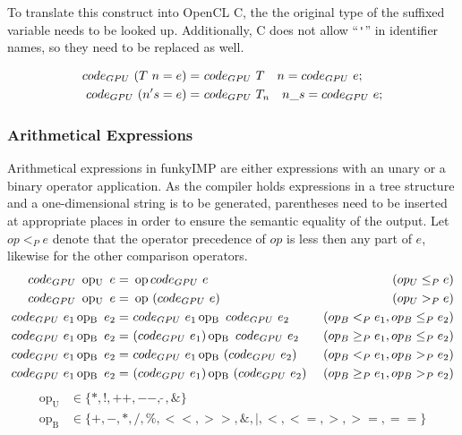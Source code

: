 

To translate this construct into OpenCL C, the the original type of the suffixed variable needs to be looked up. Additionally, C does not allow ``\verb!'!'' in identifier names, so they need to be replaced as well.

\begin{align}
	code_{GPU}\ (T\ n = e) =	&\ code_{GPU}\ T\quad n = code_{GPU}\ e;\\
	code_{GPU}\ (n's = e) =		&\ code_{GPU}\ T_n\quad n\_s = code_{GPU}\ e; \notag
\end{align}

\subsubsection{Arithmetical Expressions}
Arithmetical expressions in funkyIMP are either expressions with an unary or a binary operator application. As the compiler holds expressions in a tree structure and a one-dimensional string is to be generated, parentheses need to be inserted at appropriate places in order to ensure the semantic equality of the output. Let $op <_{P} e$ denote that the operator precedence of $op$ is less then any part of $e$, likewise for the other comparison operators. 
\begin{align}
	code_{GPU}\ \operatorname{op_U}\ e = &\ \operatorname{op} code_{GPU}\ e &\ (op_U \leq_P e)\\
	code_{GPU}\ \operatorname{op_U}\ e = &\ \operatorname{op}\ (code_{GPU}\ e) &\ (op_U >_P e)\notag\\
	code_{GPU}\ e_1\operatorname{op_B}\ e_2 = &\ code_{GPU}\ e_1\operatorname{op_B}\ code_{GPU}\ e_2 &\ (op_B <_P e_1, op_B \leq_P e_2)\notag\\
	code_{GPU}\ e_1\operatorname{op_B}\ e_2 = &\ (code_{GPU}\ e_1)\operatorname{op_B}\ code_{GPU}\ e_2 &\ (op_B \geq_P e_1, op_B \leq_P e_2)\notag\\
	code_{GPU}\ e_1\operatorname{op_B}\ e_2 = &\ code_{GPU}\ e_1\operatorname{op_B}\ (code_{GPU}\ e_2) &\ (op_B <_P e_1, op_B >_P e_2)\notag\\
	code_{GPU}\ e_1\operatorname{op_B}\ e_2 = &\ (code_{GPU}\ e_1)\operatorname{op_B}\ (code_{GPU}\ e_2) &\ (op_B \geq_P e_1, op_B >_P e_2) \notag
\end{align}
\begin{align*}
	\operatorname{op_U} &\in \{*, !, ++,--,\tilde\ , \& \}\\
	\operatorname{op_B} &\in \{+,-,*,/,\%,<<,>>,\&,|, <, <=, >, >=, ==\}
\end{align*}

